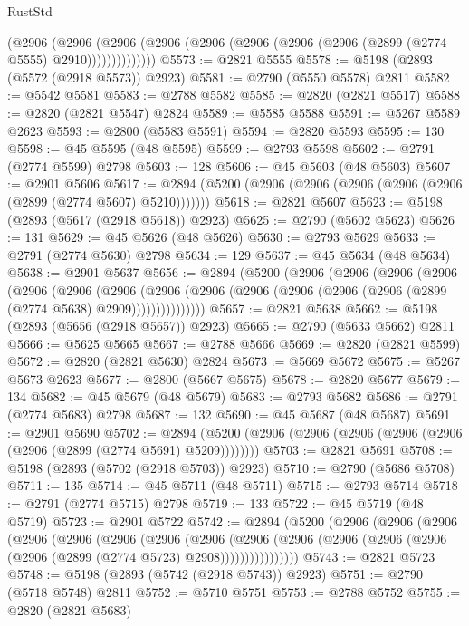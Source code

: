 \begin{lexlean}{RustStd}
\begin{coremodule}
              (@2906
                (@2906
                  (@2906 (@2906 (@2906 (@2906 (@2906 (@2906 (@2899 (@2774 @5555) @2910))))))))))))))
@5573 := @2821 @5555
@5578 := @5198 (@2893 (@5572 (@2918 @5573)) @2923)
@5581 := @2790 (@5550 @5578) @2811
@5582 := @5542 @5581
@5583 := @2788 @5582
@5585 := @2820 (@2821 @5517)
@5588 := @2820 (@2821 @5547) @2824
@5589 := @5585 @5588
@5591 := @5267 @5589 @2623
@5593 := @2800 (@5583 @5591)
@5594 := @2820 @5593
@5595 := 130
@5598 := @45 @5595 (@48 @5595)
@5599 := @2793 @5598
@5602 := @2791 (@2774 @5599) @2798
@5603 := 128
@5606 := @45 @5603 (@48 @5603)
@5607 := @2901 @5606
@5617 := @2894 (@5200 (@2906 (@2906 (@2906 (@2906 (@2906 (@2899 (@2774 @5607) @5210)))))))
@5618 := @2821 @5607
@5623 := @5198 (@2893 (@5617 (@2918 @5618)) @2923)
@5625 := @2790 (@5602 @5623)
@5626 := 131
@5629 := @45 @5626 (@48 @5626)
@5630 := @2793 @5629
@5633 := @2791 (@2774 @5630) @2798
@5634 := 129
@5637 := @45 @5634 (@48 @5634)
@5638 := @2901 @5637
@5656 := @2894
    (@5200
      (@2906
        (@2906
          (@2906
            (@2906
              (@2906
                (@2906
                  (@2906
                    (@2906
                      (@2906 (@2906 (@2906 (@2906 (@2906 (@2899 (@2774 @5638) @2909)))))))))))))))
@5657 := @2821 @5638
@5662 := @5198 (@2893 (@5656 (@2918 @5657)) @2923)
@5665 := @2790 (@5633 @5662) @2811
@5666 := @5625 @5665
@5667 := @2788 @5666
@5669 := @2820 (@2821 @5599)
@5672 := @2820 (@2821 @5630) @2824
@5673 := @5669 @5672
@5675 := @5267 @5673 @2623
@5677 := @2800 (@5667 @5675)
@5678 := @2820 @5677
@5679 := 134
@5682 := @45 @5679 (@48 @5679)
@5683 := @2793 @5682
@5686 := @2791 (@2774 @5683) @2798
@5687 := 132
@5690 := @45 @5687 (@48 @5687)
@5691 := @2901 @5690
@5702 := @2894 (@5200 (@2906 (@2906 (@2906 (@2906 (@2906 (@2906 (@2899 (@2774 @5691) @5209))))))))
@5703 := @2821 @5691
@5708 := @5198 (@2893 (@5702 (@2918 @5703)) @2923)
@5710 := @2790 (@5686 @5708)
@5711 := 135
@5714 := @45 @5711 (@48 @5711)
@5715 := @2793 @5714
@5718 := @2791 (@2774 @5715) @2798
@5719 := 133
@5722 := @45 @5719 (@48 @5719)
@5723 := @2901 @5722
@5742 := @2894
    (@5200
      (@2906
        (@2906
          (@2906
            (@2906
              (@2906
                (@2906
                  (@2906
                    (@2906
                      (@2906
                        (@2906
                          (@2906 (@2906 (@2906 (@2906 (@2899 (@2774 @5723) @2908))))))))))))))))
@5743 := @2821 @5723
@5748 := @5198 (@2893 (@5742 (@2918 @5743)) @2923)
@5751 := @2790 (@5718 @5748) @2811
@5752 := @5710 @5751
@5753 := @2788 @5752
@5755 := @2820 (@2821 @5683)

\end{coremodule}
\end{lexlean}
